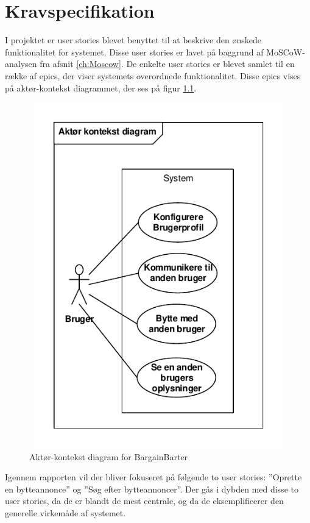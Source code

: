 \chapter{Kravspecifikation}\label{ch:Krav}

I projektet er user stories blevet benyttet til at beskrive den ønskede funktionalitet for systemet. Disse user stories er lavet på baggrund af MoSCoW-analysen fra afsnit \ref{ch:Moscow}.
De enkelte user stories er blevet samlet til en række af epics, der viser systemets overordnede funktionalitet. Disse epics vises på aktør-kontekst diagrammet, der ses på figur \ref{fig:KontekstDia}. 

\begin{figure}[H]
	\includegraphics[width=140mm,height=150mm]{../Dokumentation/figures/KontekstDiagram.PDF}
	\caption{Aktør-kontekst diagram for BargainBarter}
	\label{fig:KontekstDia}
\end{figure}

\noindent Igennem rapporten vil der bliver fokuseret på følgende to user stories: ''Oprette en bytteannonce'' og ''Søg efter bytteannoncer''. Der gås i dybden med disse to user stories, da de er blandt de mest centrale, og da de eksemplificerer den generelle virkemåde af systemet.\\

